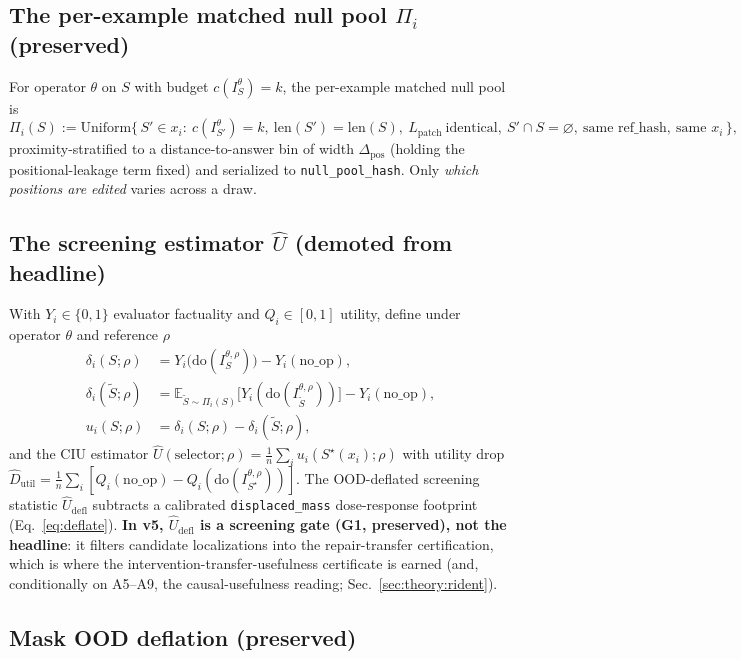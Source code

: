 \documentclass[11pt]{article}
\theoremstyle{plain}
\theoremstyle{definition}
\newcommand{\Uhat}{\widehat{U}}
\newcommand{\Udefl}{\widehat{U}_{\mathrm{defl}}}
\newcommand{\Dutil}{\widehat{D}_{\mathrm{util}}}
\newcommand{\Pii}{\Pi_i}
\newcommand{\dpos}{\Delta_{\mathrm{pos}}}
\newcommand{\Eop}{\mathbb{E}}
\newcommand{\noop}{\mathrm{no\_op}}
\newcommand{\Sstar}{S^{\star}}
\begin{document}
\subsection{The per-example matched null pool $\Pii$ (preserved)}\label{sec:ciu:null}

For operator $\theta$ on $S$ with budget $c(I^\theta_S)=k$, the per-example matched
null pool is
\begin{equation}
\Pii(S) := \mathrm{Uniform}\Big\{\, S'\in x_i :\ c(I^\theta_{S'})=k,\ \mathrm{len}(S')=\mathrm{len}(S),
\ L_{\mathrm{patch}}\ \text{identical},\ S'\cap S=\varnothing,
\ \text{same ref\_hash},\ \text{same } x_i \,\Big\},
\label{eq:pool}
\end{equation}
proximity-stratified to a distance-to-answer bin of width $\dpos$ (holding the
positional-leakage term fixed) and serialized to \texttt{null\_pool\_hash}. Only
\emph{which positions are edited} varies across a draw.

\subsection{The screening estimator $\Uhat$ (demoted from headline)}\label{sec:ciu:estimator}

With $Y_i\in\{0,1\}$ evaluator factuality and $Q_i\in[0,1]$ utility, define under
operator $\theta$ and reference $\rho$
\begin{align}
\delta_i(S;\rho) &= Y_i\!\big(\mathrm{do}(I^{\theta,\rho}_S)\big) - Y_i(\noop),\\
\delta_i(\tilde S;\rho) &= \Eop_{\tilde S\sim\Pii(S)}\!\big[Y_i(\mathrm{do}(I^{\theta,\rho}_{\tilde S}))\big] - Y_i(\noop),\\
u_i(S;\rho) &= \delta_i(S;\rho) - \delta_i(\tilde S;\rho),
\label{eq:ui}
\end{align}
and the CIU estimator $\Uhat(\text{selector};\rho)=\frac1n\sum_i u_i(\Sstar(x_i);\rho)$
with utility drop $\Dutil=\frac1n\sum_i[Q_i(\noop)-Q_i(\mathrm{do}(I^{\theta,\rho}_{\Sstar}))]$.
The OOD-deflated screening statistic $\Udefl$ subtracts a calibrated
\texttt{displaced\_mass} dose-response footprint (Eq.~\ref{eq:deflate}). \textbf{In
v5, $\Udefl$ is a screening gate (G1, preserved), not the headline}: it filters
candidate localizations into the repair-transfer certification, which is where the
intervention-transfer-usefulness certificate is earned (and, conditionally on
A5--A9, the causal-usefulness reading; Sec.~\ref{sec:theory:rident}).

\subsection{Mask OOD deflation (preserved)}\label{sec:ciu:ood}
\end{document}
